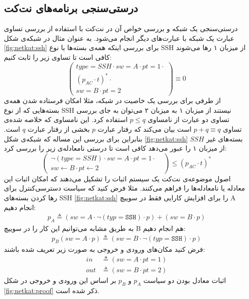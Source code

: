\documentclass[
msc,
irfonts
]{./tex/tehran-thesis}
\newcommand{\پ}{پروژه/پایان‌نامه/رساله }
\theoremstyle{definition}
\theoremstyle{theorem}
\theoremstyle{definition}
\numberwithin{algorithm}{chapter}
\newcommand{\la}{\leftarrow}
\newcommand{\lf}[1]{\LTRfootnote{#1}}
\begin{document}
\subsection{درستی‌سنجی برنامه‌های نت‌کت}
درستی‌سنجی یک شبکه و بررسی خواص آن در نت‌کت با استفاده از بررسی تساوی عبارت یک شبکه با عبارت‌های دیگر انجام می‌شود.
به عنوان مثال در شبکه‌ی شکل
\ref{fig:netkat:ssh}
برای بررسی اینکه همه‌ی بسته‌ها با نوع
SSH
از میزبان ۱ رها می‌شوند کافی است تا تساوی زیر را ثابت کنیم:
\begin{equation*}
    \begin{pmatrix}
        type = SSH \cdot sw = A \cdot pt = 1 \cdot \\
        (p_{AC}\cdot t) ^ * \cdot                  \\
        sw = B\cdot pt = 2
    \end{pmatrix}
    \equiv 0
\end{equation*}
از طرفی برای بررسی یک خاصیت در شبکه، مثلا امکان فرستاده شدن‌ همه‌ی بسته‌هایی که از نوع
SSH
نیستند از میزبان ۱ به میزبان ۲
می‌توان به جای بررسی تساوی دو عبارت از نامساوی
$p \leq q$
استفاده کرد.
این نامساوی که خلاصه شده‌ی تساوی
$p + q \equiv q$
است بیان می‌کند که رفتار عبارت
$p$
بخشی از رفتار عبارت
$q$
است.
بنابراین برای بررسی این مساله که شبکه‌ی شکل
\ref{fig:netkat:ssh}
بسته‌های غیر
$SSH$
از میزبان ۱ را عبور می‌دهد کافی است تا درستی نامعادله‌ی زیر را بررسی کرد:
\begin{equation*}
    \begin{pmatrix}
        \neg(type = SSH) \cdot sw = A \cdot pt = 1 \cdot & \\
        sw \la B \cdot pt \la 2                          &
    \end{pmatrix}
    \leq (p_{AC}\cdot t)^ *
\end{equation*}
اصول موضوعه‌ی نت‌کت یک سیستم اثبات\lf{Proof System}
را تشکیل می‌دهند که امکان اثبات این معادله یا نامعادله‌ها را فراهم می‌کنند.
مثلا فرض کنید که سیاست دسترسی‌کنترل برای رها کردن بسته‌های
SSH
\ref{fig:netkat:ssh}
را برای افزایش کارایی فقط در سوییچ
A
انجام دهیم:
\begin{align*}
    p_A \triangleq (sw = A \cdot \neg(typ = \texttt{SSH})\cdot p)
    + (sw = B \cdot p)
\end{align*}
به طریق مشابه می‌توانیم این کار را در سوییچ
B
هم انجام دهیم:
\begin{align*}
    p_B (sw = A\cdot p) \triangleq (sw = B \cdot \neg(typ = \texttt{SSH})\cdot p)
\end{align*}
فرض کنید مکان‌های ورودی و خروجی به صورت زیر تعریف شده باشند:
\begin{align*}
    in  & \triangleq (sw = A \cdot pt = 1) \\
    out & \triangleq (sw = B \cdot pt = 2)
\end{align*}
اثبات معادل بودن دو سیاست
$p_A$
و
$p_B$
بر اساس این ورودی و خروجی در شکل
\ref{fig:netkat:proof}
ذکر شده است.
\end{document}
